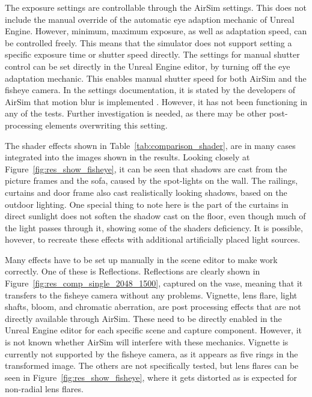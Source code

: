 The exposure settings are controllable through the AirSim settings. This does not include the manual override of the automatic eye adaption mechanic of Unreal Engine. However, minimum, maximum exposure, as well as adaptation speed, can be controlled freely. This means that the simulator does not support setting a specific exposure time or shutter speed directly. The settings for manual shutter control can be set directly in the Unreal Engine editor, by turning off the eye adaptation mechanic. This enables manual shutter speed for both AirSim and the fisheye camera. In the settings documentation, it is stated by the developers of AirSim that motion blur is implemented \cite{AirSimSettings}. However, it has not been functioning in any of the tests. Further investigation is needed, as there may be other post-processing elements overwriting this setting.

The shader effects shown in Table~\ref{tab:comparison_shader}, are in many cases integrated into the images shown in the results. Looking closely at Figure~\ref{fig:res_show_fisheye}, it can be seen that shadows are cast from the picture frames and the sofa, caused by the spot-lights on the wall. The railings, curtains and door frame also cast realistically looking shadows, based on the outdoor lighting. One special thing to note here is the part of the curtains in direct sunlight does not soften the shadow cast on the floor, even though much of the light passes through it, showing some of the shaders deficiency. It is possible, hovever, to recreate these effects with additional artificially placed light sources.

Many effects have to be set up manually in the scene editor to make work correctly. One of these is Reflections. Reflections are clearly shown in Figure~\ref{fig:res_comp_single_2048_1500}, captured on the vase, meaning that it transfers to the fisheye camera without any problems. Vignette, lens flare, light shafts, bloom, and chromatic aberration, are post processing effects that are not directly available through AirSim. These need to be directly enabled in the Unreal Engine editor for each specific scene and capture component. However, it is not known whether AirSim will interfere with these mechanics. Vignette is currently not supported by the fisheye camera, as it appears as five rings in the transformed image. The others are not specifically tested, but lens flares can be seen in Figure~\ref{fig:res_show_fisheye}, where it gets distorted as is expected for non-radial lens flares.


